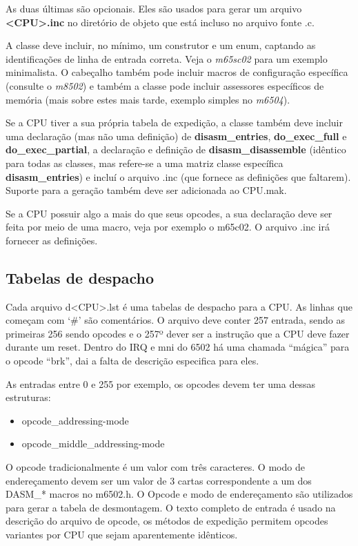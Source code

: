 \documentclass[letterpaper,10pt,brazil]{sphinxmanual}
\begin{document}
As duas últimas são opcionais. Eles são usados para gerar um arquivo
\textbf{\textless{}CPU\textgreater{}.inc} no diretório de objeto que está incluso no arquivo fonte
.c.

A classe deve incluir, no mínimo, um construtor e um enum, captando as
identificações de linha de entrada correta. Veja o \emph{m65sc02} para um
exemplo minimalista. O cabeçalho também pode incluir macros de
configuração específica (consulte o \emph{m8502}) e também a classe pode
incluir assessores específicos de memória (mais sobre estes mais tarde,
exemplo simples no \emph{m6504}).

Se a CPU tiver a sua própria tabela de expedição, a classe também deve
incluir uma declaração (mas não uma definição) de \textbf{disasm\_entries},
\textbf{do\_exec\_full} e \textbf{do\_exec\_partial}, a declaração e definição de
\textbf{disasm\_disassemble} (idêntico para todas as classes, mas refere-se a
uma matriz classe específica \textbf{disasm\_entries}) e incluí o arquivo .inc
(que fornece as definições que faltarem). Suporte para a geração também
deve ser adicionada ao CPU.mak.

Se a CPU possuir algo a mais do que seus opcodes, a sua declaração deve
ser feita por meio de uma macro, veja por exemplo o m65c02. O arquivo
.inc irá fornecer as definições.


\subsection{Tabelas de despacho}
\label{techspecs/m6502:tabelas-de-despacho}
Cada arquivo d\textless{}CPU\textgreater{}.lst é uma tabelas de despacho para a CPU. As linhas
que começam com `\#' são comentários. O arquivo deve conter 257 entrada,
sendo as primeiras 256 sendo opcodes e o 257º dever ser a instrução que
a CPU deve fazer durante um reset. Dentro do IRQ e mni do 6502 há uma
chamada ``mágica'' para o opcode ``brk'', dai a falta de descrição
especifica para eles.

As entradas entre 0 e 255 por exemplo, os opcodes devem ter uma dessas
estruturas:
\begin{itemize}
\item {} 
opcode\_addressing-mode

\item {} 
opcode\_middle\_addressing-mode

\end{itemize}

O opcode tradicionalmente é um valor com três caracteres. O modo de
endereçamento devem ser um valor de 3 cartas correspondente a um dos
DASM\_* macros no m6502.h. O Opcode e modo de endereçamento são
utilizados para gerar a tabela de desmontagem. O texto completo de
entrada é usado na descrição do arquivo de opcode, os métodos de
expedição permitem opcodes variantes por CPU que sejam aparentemente
idênticos.
\end{document}
